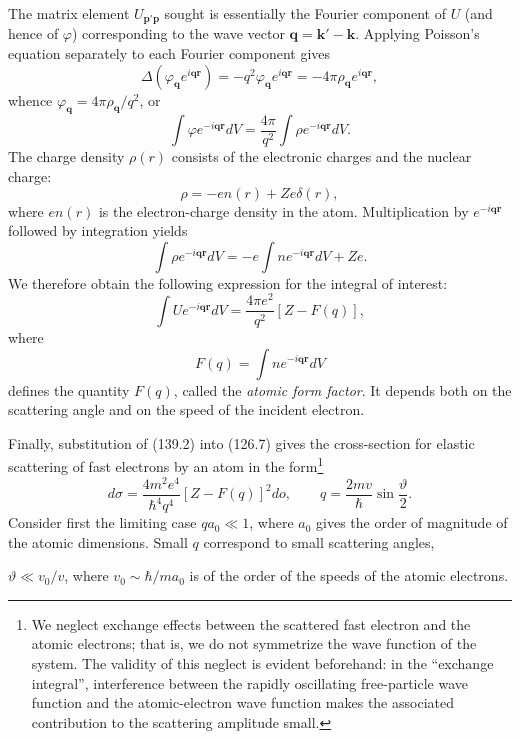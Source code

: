 The matrix element $U_{\mathbf p'\mathbf p}$ sought is essentially the Fourier component of $U$ (and hence of $\varphi$) corresponding to the wave vector $\mathbf q=\mathbf k'-\mathbf k$. Applying Poisson's equation separately to each Fourier component gives
\[
 \Delta(\varphi_{\mathbf q}e^{i\mathbf{qr}})=-q^2\varphi_{\mathbf q}e^{i\mathbf{qr}}
 =-4\pi\rho_{\mathbf q}e^{i\mathbf{qr}},
\]
whence $\varphi_{\mathbf q}=4\pi\rho_{\mathbf q}/q^2$, or
\begin{equation}
 \int\varphi e^{-i\mathbf{qr}}dV=\frac{4\pi}{q^2}\int\rho e^{-i\mathbf{qr}}dV.
 \tag{139.1}
\end{equation}
The charge density $\rho(r)$ consists of the electronic charges and the nuclear charge:
\[
 \rho=-en(r)+Ze\delta(r),
\]
where $en(r)$ is the electron-charge density in the atom. Multiplication by $e^{-i\mathbf{qr}}$ followed by integration yields
\[
 \int\rho e^{-i\mathbf{qr}}dV=-e\int ne^{-i\mathbf{qr}}dV+Ze.
\]
We therefore obtain the following expression for the integral of interest:
\begin{equation}
 \int Ue^{-i\mathbf{qr}}dV=\frac{4\pi e^2}{q^2}[Z-F(q)],
 \tag{139.2}
\end{equation}
where
\begin{equation}
 F(q)=\int ne^{-i\mathbf{qr}}dV
 \tag{139.3}
\end{equation}
defines the quantity $F(q)$, called the \emph{atomic form factor}. It depends both on the scattering angle and on the speed of the incident electron.

Finally, substitution of (139.2) into (126.7) gives the cross-section for elastic scattering of fast electrons by an atom in the form\footnote{We neglect exchange effects between the scattered fast electron and the atomic electrons; that is, we do not symmetrize the wave function of the system. The validity of this neglect is evident beforehand: in the ``exchange integral'', interference between the rapidly oscillating free-particle wave function and the atomic-electron wave function makes the associated contribution to the scattering amplitude small.}
\begin{equation}
 d\sigma=\frac{4m^2e^4}{\hbar^4q^4}[Z-F(q)]^2d o,\qquad
 q=\frac{2mv}{\hbar}\sin\frac\vartheta2.
 \tag{139.4}
\end{equation}
Consider first the limiting case $qa_0\ll1$, where $a_0$ gives the order of magnitude of the atomic dimensions. Small $q$ correspond to small scattering angles,

$\vartheta\ll v_0/v$, where $v_0\sim\hbar/ma_0$ is of the order of the speeds of the atomic electrons.

